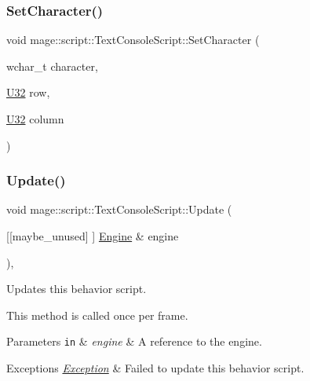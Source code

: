\subsubsection{\texorpdfstring{Set\+Character()}{SetCharacter()}}
{\footnotesize\ttfamily void mage\+::script\+::\+Text\+Console\+Script\+::\+Set\+Character (\begin{DoxyParamCaption}\item[{wchar\+\_\+t}]{character,  }\item[{\mbox{\hyperlink{namespacemage_aa5d6eaabaac3cdd01873d6a3d27e90f3}{U32}}}]{row,  }\item[{\mbox{\hyperlink{namespacemage_aa5d6eaabaac3cdd01873d6a3d27e90f3}{U32}}}]{column }\end{DoxyParamCaption})\hspace{0.3cm}{\ttfamily [private]}}

\mbox{\label{classmage_1_1script_1_1_text_console_script_ad619f93a946660b30f5e39821778f7b0}} 
\subsubsection{\texorpdfstring{Update()}{Update()}}
{\footnotesize\ttfamily void mage\+::script\+::\+Text\+Console\+Script\+::\+Update (\begin{DoxyParamCaption}\item[{\mbox{[}\mbox{[}maybe\+\_\+unused\mbox{]} \mbox{]} \mbox{\hyperlink{classmage_1_1_engine}{Engine}} \&}]{engine }\end{DoxyParamCaption})\hspace{0.3cm}{\ttfamily [override]}, {\ttfamily [virtual]}}

Updates this behavior script.

This method is called once per frame.


\begin{DoxyParams}[1]{Parameters}
\mbox{\tt in}  & {\em engine} & A reference to the engine. \\
\hline
\end{DoxyParams}

\begin{DoxyExceptions}{Exceptions}
{\em \mbox{\hyperlink{classmage_1_1_exception}{Exception}}} & Failed to update this behavior script. \\
\hline
\end{DoxyExceptions}


